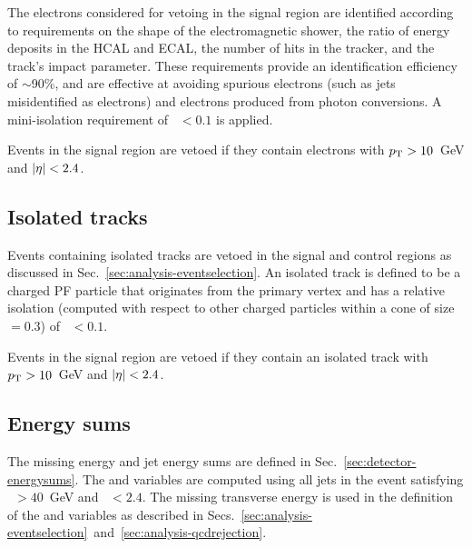 The electrons considered for vetoing in the signal region are identified 
according to requirements on the shape of the electromagnetic shower, the ratio 
of energy deposits in the HCAL and ECAL, the number of hits in the tracker, and 
the track's impact parameter.  %
These requirements provide an identification efficiency of $\sim$90\%, and are 
effective at %
avoiding spurious electrons (such as jets misidentified as 
electrons) and electrons produced from photon conversions. %
A mini-isolation requirement of \miniiso~$<0.1$ is applied.

Events in the signal region are vetoed if they contain 
electrons with ${p_{\text T}}>10$~GeV and $|\eta|<2.4$.

\subsection*{Isolated tracks}
Events containing isolated tracks are vetoed in the signal and control regions 
as discussed in Sec.~\ref{sec:analysis-eventselection}. An isolated track is 
defined to be a 
charged PF particle that originates from the primary vertex and has a relative 
isolation (computed with respect to other charged particles within a cone 
of size \DR$=0.3$) of \reliso~$ < 0.1$.

Events in the signal region are vetoed if they contain 
an isolated track with ${p_{\text T}}>10$~GeV and $|\eta|<2.4$.

\subsection*{Energy sums}
The missing energy and jet energy sums are defined in 
Sec.~\ref{sec:detector-energysums}. 
The \scalht and \MHT variables are computed using all jets in the event 
satisfying \pt~$>40$~GeV and \etaabs~$<2.4$.
The missing transverse energy \met is used in the definition of the \mt and 
\mhtmet variables as described in 
Secs.~\ref{sec:analysis-eventselection}~and~\ref{sec:analysis-qcdrejection}.


